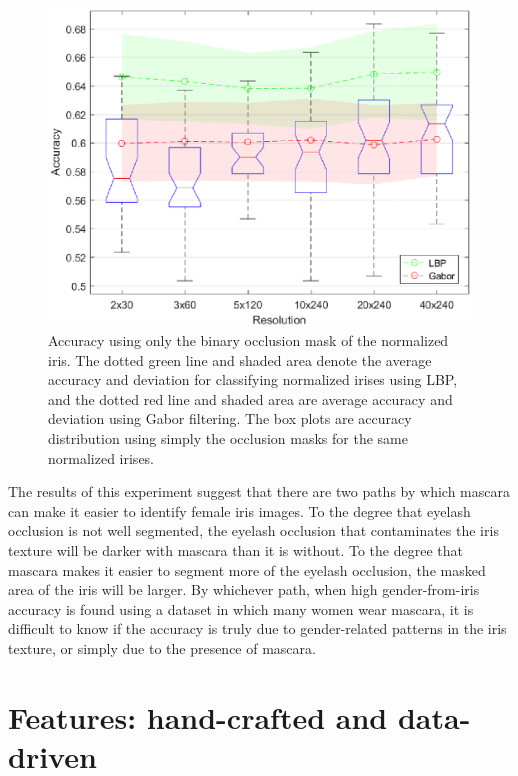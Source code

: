 \documentclass[10pt,twocolumn,letterpaper]{article}
\begin{document}
\begin{figure}[htb]
    \centering
    \includegraphics[width=1\linewidth]{img/dist_mask_cmp.eps}
    \caption{Accuracy using only the binary occlusion mask of the normalized iris. The dotted green line and shaded area denote the average accuracy and deviation for classifying normalized irises using LBP, and the dotted red line and shaded area are average accuracy and deviation using Gabor filtering. The box plots are accuracy distribution using simply the occlusion masks for the same normalized irises.
}
    \label{fig:maskcomp}
\end{figure}


The results of this experiment suggest that there are two paths by which mascara can make it easier to identify female iris images.
To the degree that eyelash occlusion is not well segmented, the eyelash occlusion that contaminates the iris texture will be darker with mascara than it is without.
To the degree that mascara makes it easier to segment more of the eyelash occlusion, the masked area of the iris will be larger.
By whichever path, when high gender-from-iris accuracy is found using a dataset in which many women wear mascara, it is difficult to know if the accuracy is truly due to gender-related patterns in the iris texture, or simply due to the presence of mascara.


\section{Features: hand-crafted and data-driven}
\label{featext}
\end{document}
